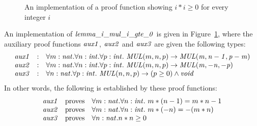 \begin{figure}[thp]

\caption{An implementation of a proof function showing $i*i\geq 0$ for every integer $i$}
\label{figure:lemma_i_mul_i_gte_0_function}
\end{figure}
An implementation of ${\it lemma\_i\_mul\_i\_gte\_0}$ is given in
Figure~\ref{figure:lemma_i_mul_i_gte_0_function}, where the auxiliary
proof functions ${\it aux1}$, ${\it aux2}$ and ${\it aux3}$ are given
the following types:
\[\begin{array}{rcl}
{\it aux1} & : &
\forall{m:{\it nat}}.\forall{n:{\it int}}.\forall{p:{\it int}}.~{\it MUL}(m,n,p)\rightarrow{\it MUL(m,n-1,p-m)} \\
{\it aux2} & : &
\forall{m:{\it nat}}.\forall{n:{\it int}}.\forall{p:{\it int}}.~{\it MUL}(m,n,p)\rightarrow{\it MUL(m,-n,-p)} \\
{\it aux3} & : &
\forall{n:{\it nat}}.\forall{p:{\it int}}.~{\it MUL}(n,n,p)\rightarrow (p\geq0)\land{\it void} \\
\end{array}\]
In other words, the following is established by these proof functions:
\[\begin{array}{rcl}
{\it aux1} & {\rm proves} & \forall{m:{\it nat}}.\forall{n:{\it int}}.~m*(n-1)=m*n - 1 \\
{\it aux2} & {\rm proves} & \forall{m:{\it nat}}.\forall{n:{\it int}}.~m*(-n)=-(m*n) \\
{\it aux3} & {\rm proves} & \forall{n:{\it nat}}.n*n\geq 0 \\
\end{array}\]


